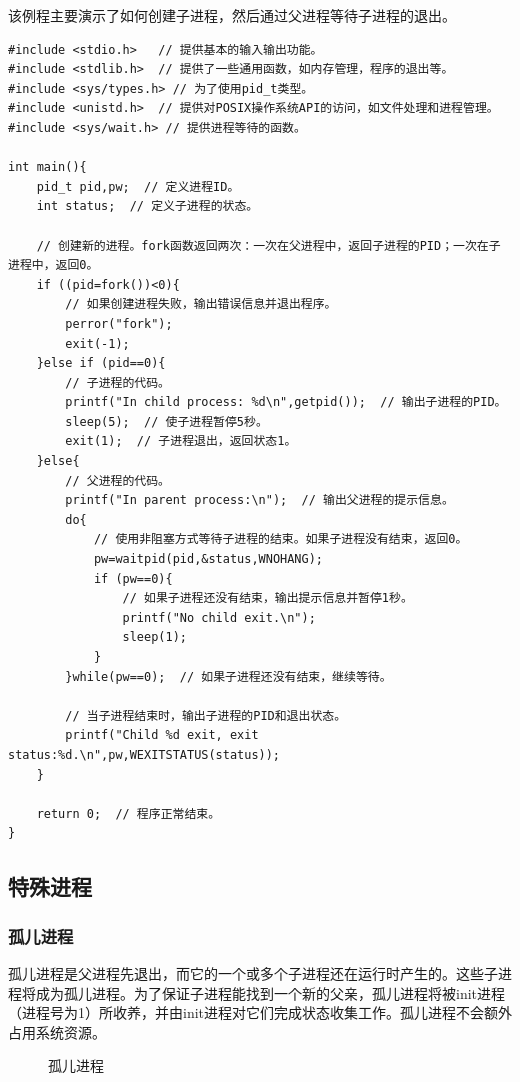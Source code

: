 \documentclass[12pt, a4paper, oneside]{ctexbook}
\numberwithin{figure}{section}
\begin{document}
该例程主要演示了如何创建子进程，然后通过父进程等待子进程的退出。

\begin{verbatim}
#include <stdio.h>   // 提供基本的输入输出功能。
#include <stdlib.h>  // 提供了一些通用函数，如内存管理，程序的退出等。
#include <sys/types.h> // 为了使用pid_t类型。
#include <unistd.h>  // 提供对POSIX操作系统API的访问，如文件处理和进程管理。
#include <sys/wait.h> // 提供进程等待的函数。

int main(){
    pid_t pid,pw;  // 定义进程ID。
    int status;  // 定义子进程的状态。

    // 创建新的进程。fork函数返回两次：一次在父进程中，返回子进程的PID；一次在子进程中，返回0。
    if ((pid=fork())<0){
        // 如果创建进程失败，输出错误信息并退出程序。
        perror("fork");
        exit(-1);
    }else if (pid==0){
        // 子进程的代码。
        printf("In child process: %d\n",getpid());  // 输出子进程的PID。
        sleep(5);  // 使子进程暂停5秒。
        exit(1);  // 子进程退出，返回状态1。
    }else{
        // 父进程的代码。
        printf("In parent process:\n");  // 输出父进程的提示信息。
        do{
            // 使用非阻塞方式等待子进程的结束。如果子进程没有结束，返回0。
            pw=waitpid(pid,&status,WNOHANG);
            if (pw==0){
                // 如果子进程还没有结束，输出提示信息并暂停1秒。
                printf("No child exit.\n");
                sleep(1);
            }
        }while(pw==0);  // 如果子进程还没有结束，继续等待。

        // 当子进程结束时，输出子进程的PID和退出状态。
        printf("Child %d exit, exit status:%d.\n",pw,WEXITSTATUS(status));
    }

    return 0;  // 程序正常结束。
}
\end{verbatim}

\subsection{特殊进程}
\subsubsection{孤儿进程}
孤儿进程是父进程先退出，而它的一个或多个子进程还在运行时产生的。这些子进程将成为孤儿进程。为了保证子进程能找到一个新的父亲，孤儿进程将被init进程（进程号为1）所收养，并由init进程对它们完成状态收集工作。孤儿进程不会额外占用系统资源。

\begin{figure}[h]
    \centering
    \caption{孤儿进程}
    \end{figure}
\end{document}
